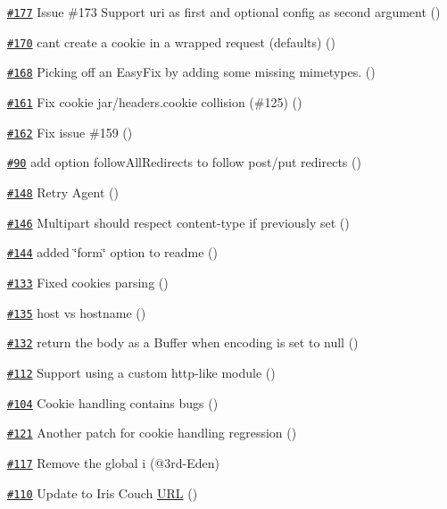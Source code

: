 \begin{DoxyItemize}
\item \href{https://github.com/request/request/pull/177}{\tt \#177} Issue \#173 Support uri as first and optional config as second argument ()
\item \href{https://github.com/request/request/pull/170}{\tt \#170} can\textquotesingle{}t create a cookie in a wrapped request (defaults) ()
\item \href{https://github.com/request/request/pull/168}{\tt \#168} Picking off an Easy\+Fix by adding some missing mimetypes. ()
\item \href{https://github.com/request/request/pull/161}{\tt \#161} Fix cookie jar/headers.\+cookie collision (\#125) ()
\item \href{https://github.com/request/request/pull/162}{\tt \#162} Fix issue \#159 ()
\item \href{https://github.com/request/request/pull/90}{\tt \#90} add option follow\+All\+Redirects to follow post/put redirects ()
\item \href{https://github.com/request/request/pull/148}{\tt \#148} Retry Agent ()
\item \href{https://github.com/request/request/pull/146}{\tt \#146} Multipart should respect content-\/type if previously set ()
\item \href{https://github.com/request/request/pull/144}{\tt \#144} added \char`\"{}form\char`\"{} option to readme ()
\item \href{https://github.com/request/request/pull/133}{\tt \#133} Fixed cookies parsing ()
\item \href{https://github.com/request/request/pull/135}{\tt \#135} host vs hostname ()
\item \href{https://github.com/request/request/pull/132}{\tt \#132} return the body as a Buffer when encoding is set to null ()
\item \href{https://github.com/request/request/pull/112}{\tt \#112} Support using a custom http-\/like module ()
\item \href{https://github.com/request/request/pull/104}{\tt \#104} Cookie handling contains bugs ()
\item \href{https://github.com/request/request/pull/121}{\tt \#121} Another patch for cookie handling regression ()
\item \href{https://github.com/request/request/pull/117}{\tt \#117} Remove the global {\ttfamily i} (@3rd-\/\+Eden)
\item \href{https://github.com/request/request/pull/110}{\tt \#110} Update to Iris Couch \mbox{\hyperlink{namespace_u_r_l}{U\+RL}} ()

\end{DoxyItemize}
